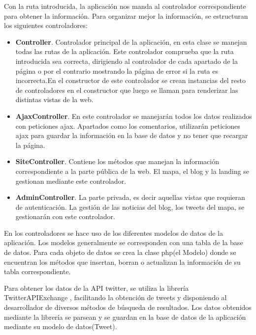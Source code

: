 Con la ruta introducida, la aplicación nos manda al controlador correspondiente para obtener la información. Para organizar mejor la información, se estructuran los siguientes controladores:

\begin{itemize}

\item \textbf{Controller}. Controlador principal de la aplicación, en esta clase se manejan todas las rutas de la aplicación. Este controlador comprueba que la ruta introducida sea correcta, dirigiendo al controlador de cada apartado de la página o por el contrario mostrando la página de error si la ruta es incorrecta.En el constructor de este controlador se crean instancias del resto de controladores en el constructor que luego se llaman para renderizar las distintas vistas de la web.

\item \textbf{AjaxController}. En este controlador se manejarán todos los datos realizados con peticiones ajax. Apartados como los comentarios, utilizarán peticiones ajax para guardar la información en la base de datos y no tener que recargar la página.

\item \textbf{SiteController}. Contiene los métodos que manejan la información correspondiente a la parte pública de la web. El mapa, el blog y la landing se gestionan mediante este controlador.

\item \textbf{AdminController}. La parte privada, es decir aquellas vistas que requieran de autenticación. La gestión de las noticias del blog, los tweets del mapa, se gestionarán con este controlador.

\end{itemize}


En los controladores se hace uso de los diferentes modelos de datos de la aplicación. Los modelos generalmente se corresponden con una tabla de la base de datos. Para cada objeto de datos se crea la clase php(el Modelo) donde se encuentran los métodos que insertan, borran o actualizan la información de su tabla correspondiente.

\vspace{5 mm}

Para obtener los datos de la API twitter, se utiliza la librería TwitterAPIExchange \cite{tweet-framework}, facilitando la obtención de tweets y disponiendo al desarrollador de diversos métodos de búsqueda de resultados. Los datos obtenidos mediante la librería se parsean y se guardan en la base de datos de la aplicación mediante su modelo de datos(Tweet).

